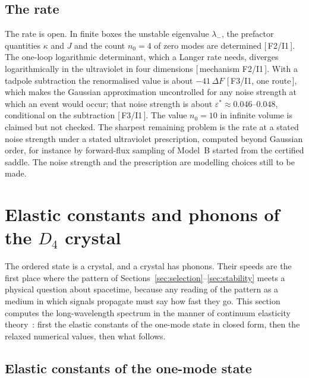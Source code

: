 \documentclass[a4paper,11pt]{article}
\numberwithin{equation}{section}
\theoremstyle{jsplain}
\theoremstyle{jsrem}
\newcommand{\grade}[1]{[\,#1\,]}
\begin{document}
\subsection{The rate}

The rate is open. In finite boxes the unstable eigenvalue $\lambda_-$, the prefactor quantities $\kappa$ and $J$ and the count $n_0=4$ of zero modes are determined \grade{F2/I1}. The one-loop logarithmic determinant, which a Langer rate needs, diverges logarithmically in the ultraviolet in four dimensions \grade{mechanism F2/I1}. With a tadpole subtraction the renormalised value is about $-41\,\Delta F$ \grade{F3/I1, one route}, which makes the Gaussian approximation uncontrolled for any noise strength at which an event would occur; that noise strength is about $\varepsilon^*\approx0.046$--$0.048$, conditional on the subtraction \grade{F3/I1}. The value $n_0=10$ in infinite volume is claimed but not checked. The sharpest remaining problem is the rate at a stated noise strength under a stated ultraviolet prescription, computed beyond Gaussian order, for instance by forward-flux sampling of Model~B started from the certified saddle. The noise strength and the prescription are modelling choices still to be made.

\section{Elastic constants and phonons of the $D_4$ crystal}\label{sec:phonons}

The ordered state is a crystal, and a crystal has phonons. Their speeds are the first place where the pattern of Sections~\ref{sec:selection}--\ref{sec:stability} meets a physical question about spacetime, because any reading of the pattern as a medium in which signals propagate must say how fast they go. This section computes the long-wavelength spectrum in the manner of continuum elasticity theory~\cite{ref47}: first the elastic constants of the one-mode state in closed form, then the relaxed numerical values, then what follows.

\subsection{Elastic constants of the one-mode state}
\end{document}
